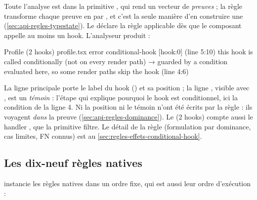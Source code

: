 
Toute l'analyse est dans la primitive , qui rend un vecteur de \emph{preuves}  ; la règle transforme chaque preuve en \Error{} par , et c'est la seule manière d'en construire une (\cref{sec:api-regles-typestate}). Le  déclare la règle applicable dès que le composant appelle au moins un hook. L'analyseur produit :

\begin{sortie}
  Profile  (2 hooks)  profile.tsx
    error  conditional-hook  [hook:0]  (line 5:10)  this hook is called conditionally (not on every render path)
       → guarded by a condition evaluated here, so some render paths skip the hook (line 4:6)
\end{sortie}

La ligne principale porte le label du hook (\code{[hook:0]}) et sa position ; la ligne , visible avec , est un \emph{témoin} : l'étape qui explique pourquoi le hook est conditionnel, ici la condition  de la ligne 4. Ni la position ni le témoin n'ont été écrits par la règle : ils voyagent \emph{dans} la preuve (\cref{sec:api-regles-dominance}). Le \og (2 hooks)\fg{} compte aussi le handler , que la primitive filtre. Le détail de la règle (formulation par dominance, cas limites, FN connus) est au \cref{sec:regles-effets-conditional-hook}.

\subsection{Les dix-neuf règles natives}

 instancie les règles natives dans un ordre fixe, qui est aussi leur ordre d'exécution :


